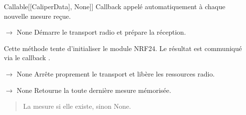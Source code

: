 \documentclass[letterpaper,10pt,french]{sphinxmanual}
\begin{document}
\begin{fulllineitems}
\begin{fulllineitems}
\begin{description}
\sphinxlineitem{on\_new\_measure}{[}Callable{[}{[}CaliperData{]}, None{]}{]}
\sphinxAtStartPar
Callback appelé automatiquement à chaque nouvelle mesure reçue.

\end{description}

\end{fulllineitems}


\begin{fulllineitems}
\label{\detokenize{api/hardware.devices:hardware.devices.caliper.CaliperDriver.start}}
\pysigstartsignatures
\pysiglinewithargsret
{}
{}
{{ $\rightarrow$ None}}
\pysigstopsignatures
\sphinxAtStartPar
Démarre le transport radio et prépare la réception.

\sphinxAtStartPar
Cette méthode tente d’initialiser le module NRF24. Le résultat
est communiqué via le callback .

\end{fulllineitems}


\begin{fulllineitems}
\label{\detokenize{api/hardware.devices:hardware.devices.caliper.CaliperDriver.stop}}
\pysigstartsignatures
\pysiglinewithargsret
{}
{}
{{ $\rightarrow$ None}}
\pysigstopsignatures
\sphinxAtStartPar
Arrête proprement le transport et libère les ressources radio.

\end{fulllineitems}


\begin{fulllineitems}
\label{\detokenize{api/hardware.devices:hardware.devices.caliper.CaliperDriver.get_last_measure}}
\pysigstartsignatures
\pysiglinewithargsret
{}
{}
{{ $\rightarrow$ {\hyperref[\detokenize{api/hardware.devices:hardware.devices.caliper.CaliperData}]{}}None}}
\pysigstopsignatures
\sphinxAtStartPar
Retourne la toute dernière mesure mémorisée.
\begin{quote}\begin{description}
\sphinxAtStartPar
La mesure si elle existe, sinon None.


\end{description}
\end{quote}
\end{fulllineitems}
\end{fulllineitems}
\end{document}

